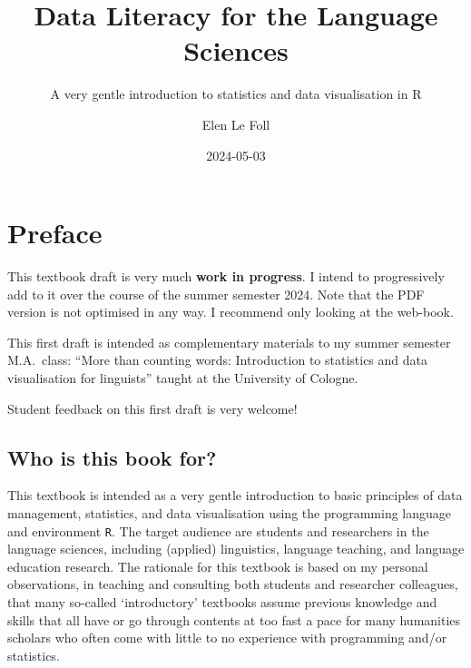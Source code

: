 \documentclass[
  letterpaper,
  DIV=11,
  numbers=noendperiod,
  oneside]{scrreprt}
\title{Data Literacy for the Language Sciences}
\subtitle{A very gentle introduction to statistics and data
visualisation in R}
\author{Elen Le Foll}
\date{2024-05-03}
\renewcommand*\contentsname{Table of contents}
\newcommand\contentsname{Table of contents}
\begin{document}
\maketitle

\renewcommand*\contentsname{Table of contents}
{
\hypersetup{linkcolor=}
\setcounter{tocdepth}{2}
\tableofcontents
}

\chapter*{Preface}\label{preface}


\begin{tcolorbox}[enhanced jigsaw, colbacktitle=quarto-callout-warning-color!10!white, colback=white, breakable, colframe=quarto-callout-warning-color-frame, coltitle=black, rightrule=.15mm, left=2mm, leftrule=.75mm, bottomrule=.15mm, titlerule=0mm, toptitle=1mm, arc=.35mm, title=\textcolor{quarto-callout-warning-color}{\faExclamationTriangle}\hspace{0.5em}{Warning}, opacitybacktitle=0.6, bottomtitle=1mm, toprule=.15mm, opacityback=0]

This textbook draft is very much \textbf{work in progress}. I intend to
progressively add to it over the course of the summer semester 2024.
Note that the PDF version is not optimised in any way. I recommend only
looking at the web-book.

This first draft is intended as complementary materials to my summer
semester M.A.~class: ``More than counting words: Introduction to
statistics and data visualisation for linguists'' taught at the
University of Cologne.

Student feedback on this first draft is very welcome!

\end{tcolorbox}

\section*{Who is this book for?}\label{who-is-this-book-for}


This textbook is intended as a very gentle introduction to basic
principles of data management, statistics, and data visualisation using
the programming language and environment \texttt{R}. The target audience
are students and researchers in the language sciences, including
(applied) linguistics, language teaching, and language education
research. The rationale for this textbook is based on my personal
observations, in teaching and consulting both students and researcher
colleagues, that many so-called `introductory' textbooks assume previous
knowledge and skills that all have or go through contents at too fast a
pace for many humanities scholars who often come with little to no
experience with programming and/or statistics.
\end{document}
